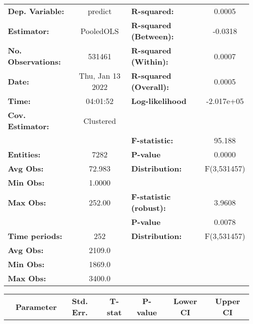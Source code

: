 \begin{center}
\begin{tabular}{lclc}
\toprule
\textbf{Dep. Variable:}    &      predict       & \textbf{  R-squared:         }   &      0.0005      \\
\textbf{Estimator:}        &     PooledOLS      & \textbf{  R-squared (Between):}  &     -0.0318      \\
\textbf{No. Observations:} &       531461       & \textbf{  R-squared (Within):}   &      0.0007      \\
\textbf{Date:}             &  Thu, Jan 13 2022  & \textbf{  R-squared (Overall):}  &      0.0005      \\
\textbf{Time:}             &      04:01:52      & \textbf{  Log-likelihood     }   &    -2.017e+05    \\
\textbf{Cov. Estimator:}   &     Clustered      & \textbf{                     }   &                  \\
\textbf{}                  &                    & \textbf{  F-statistic:       }   &      95.188      \\
\textbf{Entities:}         &        7282        & \textbf{  P-value            }   &      0.0000      \\
\textbf{Avg Obs:}          &       72.983       & \textbf{  Distribution:      }   &   F(3,531457)    \\
\textbf{Min Obs:}          &       1.0000       & \textbf{                     }   &                  \\
\textbf{Max Obs:}          &       252.00       & \textbf{  F-statistic (robust):} &      3.9608      \\
\textbf{}                  &                    & \textbf{  P-value            }   &      0.0078      \\
\textbf{Time periods:}     &        252         & \textbf{  Distribution:      }   &   F(3,531457)    \\
\textbf{Avg Obs:}          &       2109.0       & \textbf{                     }   &                  \\
\textbf{Min Obs:}          &       1869.0       & \textbf{                     }   &                  \\
\textbf{Max Obs:}          &       3400.0       & \textbf{                     }   &                  \\
\bottomrule
\end{tabular}
\begin{tabular}{lcccccc}
                & \textbf{Parameter} & \textbf{Std. Err.} & \textbf{T-stat} & \textbf{P-value} & \textbf{Lower CI} & \textbf{Upper CI}  \\

\end{tabular}
\end{center}
